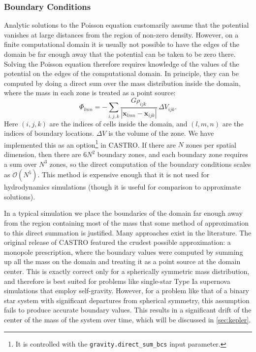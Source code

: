 \documentclass[iop]{../emulateapj}
\begin{document}
\subsubsection{Boundary Conditions}\label{sec:gravity_boundary_conditions}

Analytic solutions to the Poisson equation customarily assume that the
potential vanishes at large distances from the region of non-zero
density. However, on a finite computational domain it is usually not
possible to have the edges of the domain be far enough away that the
potential can be taken to be zero there. Solving the Poisson equation
therefore requires knowledge of the values of the potential on the
edges of the computational domain. In principle, they can be computed
by doing a direct sum over the mass distribution inside the domain,
where the mass in each zone is treated as a point source:
\begin{equation}
  \Phi_{{lmn}} = -\sum_{{i, j, k}} \frac{G \rho_{{ijk}}}{|\mathbf{x}_{{lmn}} - \mathbf{x}_{{ijk}}|}\, \Delta V_{{ijk}}.\label{eq:direct_sum}
\end{equation}
Here $(i, j, k)$ are the indices of cells inside the domain, and $(l,m, n)$ 
are the indices of boundary locations. $\Delta V$ is the volume of the
zone. We have implemented this as an option\footnote{It is controlled
  with the \texttt{gravity.direct\_sum\_bcs} input parameter.} in
CASTRO. If there are $N$ zones per spatial dimension, then there are
$6 N^2$ boundary zones, and each boundary zone requires a sum over
$N^3$ zones, so the direct computation of the boundary conditions
scales as $\mathcal{O}(N^5)$.  This method is expensive enough that it is not used
for hydrodynamics simulations (though it is useful for comparison to
approximate solutions).

In a typical simulation we place the boundaries of the domain far
enough away from the region containing most of the mass that some
method of approximation to this direct summation is justified. Many
approaches exist in the literature. The original release of CASTRO
featured the crudest possible approximation: a monopole prescription,
where the boundary values were computed by summing up all the mass on
the domain and treating it as a point source at the domain
center. This is exactly correct only for a spherically symmetric mass
distribution, and therefore is best suited for problems like
single-star Type Ia supernova simulations that employ
self-gravity. However, for a problem like that of a binary star system
with significant departures from spherical symmetry, this assumption
fails to produce accurate boundary values. This results in a
significant drift of the center of the mass of the system over time,
which will be discussed in \autoref{sec:kepler}.
\end{document}

